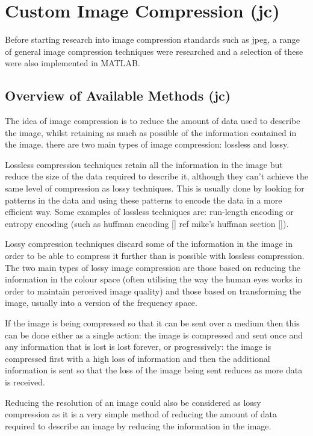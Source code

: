 \section{Custom Image Compression (jc)}
\label{Custom_comp_research}

Before starting research into image compression standards such as jpeg, a range of general image compression techniques were researched and a selection of these were also implemented in MATLAB.

\subsection{Overview of Available Methods (jc)}

The idea of image compression is to reduce the amount of data used to describe the image, whilst retaining as much as possible of the information contained in the image. there are two main types of image compression: lossless and lossy.

Lossless compression techniques retain all the information in the image but reduce the size of the data required to describe it, although they can't achieve the same level of compression as lossy techniques. This is usually done by looking for patterns in the data and using these patterns to encode the data in a more efficient way. Some examples of lossless techniques are: run-length encoding or entropy encoding (such as huffman encoding [] ref mike's huffman section []). \cite{image_compression}

Lossy compression techniques discard some of the information in the image in order to be able to compress it further than is possible with lossless compression. The two main types of lossy image compression are those based on reducing the information in the colour space (often utilising the way the human eyes works in order to maintain perceived image quality) and those based on transforming the image, usually into a version of the frequency space. \cite{image_compression}

If the image is being compressed so that it can be sent over a medium then this can be done either as a single action: the image is compressed and sent once and any information that is lost is lost forever, or progressively: the image is compressed first with a high loss of information and then the additional information is sent so that the loss of the image being sent reduces as more data is received.

Reducing the resolution of an image could also be considered as lossy compression as it is a very simple method of reducing the amount of data required to describe an image by reducing the information in the image.

